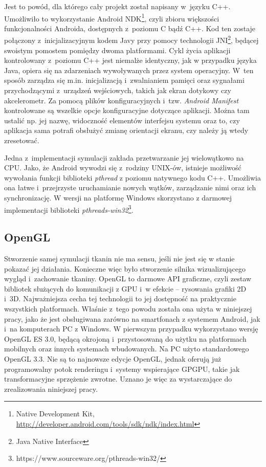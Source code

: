 		Jest to powód, dla którego cały projekt został napisany w~języku C++. Umożliwiło to wykorzystanie Android NDK\footnote{Native Development Kit, \href{http://developer.android.com/tools/sdk/ndk/index.html}{http://developer.android.com/tools/sdk/ndk/index.html}}, czyli zbioru większości funkcjonalności Androida, dostępnych z~poziomu C bądź C++. Kod ten zostaje połączony z~inicjalizacyjnym kodem Javy przy pomocy technologii JNI\footnote{Java Native Interface}, będącej swoistym pomostem pomiędzy dwoma platformami. Cykl życia aplikacji kontrolowany z~poziomu C++ jest niemalże identyczny, jak w przypadku języka Java, opiera się na zdarzeniach wywoływanych przez system operacyjny. W~ten sposób zarządza się m.in. inicjalizacją i~zwalnianiem pamięci oraz sygnałami przychodzącymi z~urządzeń wejściowych, takich jak ekran dotykowy czy akcelerometr. Za pomocą plików konfiguracyjnych i~tzw. \emph{Android Manifest} kontrolowane są wszelkie opcje konfiguracyjne dotyczące aplikacji. Można tam ustalić np. jej nazwę, widoczność elementów interfejsu systemu oraz to, czy aplikacja sama potrafi obsłużyć zmianę orientacji ekranu, czy należy ją wtedy zresetować.
		
		Jedna z~implementacji symulacji zakłada przetwarzanie jej wielowątkowo na CPU. Jako, że Android wywodzi się z~rodziny UNIX-ów, istnieje możliwość wywołania funkcji biblioteki \emph{pthread} z poziomu natywnego kodu C++. Umożliwia ona łatwe i~przejrzyste uruchamianie nowych wątków, zarządzanie nimi oraz ich synchronizację. W wersji na platformę Windows skorzystano z darmowej implementacji biblioteki \emph{pthreads-win32}\footnote{https://www.sourceware.org/pthreads-win32/}.
	
		\subsection{OpenGL}
		\label{t:technologie:narzedzia:ogl}
		
		
		Stworzenie samej symulacji tkanin nie ma sensu, jeśli nie jest się w stanie pokazać jej działania. Konieczne więc było stworzenie silnika wizualizującego wygląd i~zachowanie tkaniny. OpenGL to darmowe API graficzne, czyli zestaw bibliotek służących do komunikacji z GPU i~w efekcie -- rysowania grafiki 2D i~3D. Najważniejsza cecha tej technologii to jej dostępność na praktycznie wszystkich platformach. Właśnie z~tego powodu została ona użyta w niniejszej pracy, jako że jest obsługiwana zarówno na smartfonach z systemem Android, jak i~na komputerach PC z Windows. W pierwszym przypadku wykorzystano wersję OpenGL ES 3.0, będącą okrojoną i~przystosowaną do użytku na platformach mobilnych oraz innych systemach wbudowanych. Na PC użyto standardowego OpenGL 3.3. Nie są to najnowsze edycje OpenGL, jednak oferują już programowalny potok renderingu i~systemy wspierające GPGPU, takie jak transformacyjne sprzężenie zwrotne. Uznano je więc za wystarczające do zrealizowania niniejszej pracy.
		
